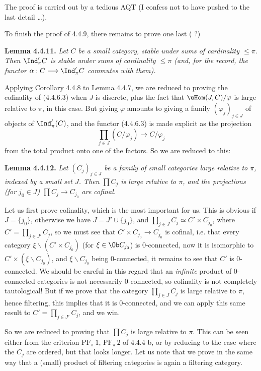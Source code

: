 The proof is carried out by a tedious AQT (I confess not to have pushed to the last detail \ldots).

To finish the proof of 4.4.9, there remains to prove one last ( ?)

\textbf{Lemma 4.4.11.} \textit{Let $C$ be a small category, stable under sums of cardinality $\leqslant \pi$. Then $\Ind'_\pi C$ is stable under sums of cardinality $\leqslant \pi$ (and, for the record, the functor $\alpha : C \longrightarrow \Ind'_\pi C$ commutes with them).}

Applying Corollary 4.4.8 to Lemma 4.4.7, we are reduced to proving the cofinality of (4.4.6.3) when $J$ is discrete, plus the fact that $\uHom(J,C)/\varphi$ is large relative to $\pi$, in this case. But giving $\varphi$ amounts to giving a family $(\varphi_j)_{j\in J}$ of objects of $\Ind'_\pi(C)$, and the functor (4.4.6.3) is made explicit as the projection
\[
\prod_{j\in J} (C/\varphi_j) \longrightarrow C/\varphi_j
\]
from the total product onto one of the factors. So we are reduced to this:

\textbf{Lemma 4.4.12.} \textit{Let $(C_j)_{j\in J}$ be a family of small categories large relative to $\pi$, indexed by a small set $J$. Then $\prod C_j$ is large relative to $\pi$, and the projections (for $j_0 \in J$) $\prod C_j \longrightarrow C_{j_0}$ are cofinal.}

Let us first prove cofinality, which is the most important for us. This is obvious if $J = \{j_0\}$, otherwise we have $J = J' \cup \{j_0\}$, and $\prod_{j\in J} C_j \simeq C' \times C_{j_0}$, where $C' = \prod_{j\in J'} C_j$, so we must see that $C' \times C_{j_0} \longrightarrow C_{j_0}$ is cofinal, i.e. that every category $\xi\backslash(C' \times C_{j_0})$ (for $\xi \in \Ob C_{j_0}$) is 0-connected, now it is isomorphic to $C' \times (\xi\backslash C_{j_0})$, and $\xi\backslash C_{j_0}$ being 0-connected, it remains to see that $C'$ is 0-connected. We should be careful in this regard that an \textit{infinite} product of 0-connected categories is not necessarily 0-connected, so cofinality is not completely tautological! But if we prove that the category $\prod_{j\in J} C_j$ is
large relative to $\pi$, hence filtering, this implies that it is 0-connected, and we can apply this same result to $C' = \prod_{j\in J'} C_j$, and we win.

So we are reduced to proving that $\prod C_j$ is large relative to $\pi$. This can be seen either from the criterion $\mathrm{PF}_\pi\,1$, $\mathrm{PF}_\pi\,2$ of 4.4.4 b, or by reducing to the case where the $C_j$ are ordered, but that looks longer. Let us note that we prove in the same way that a (small) product of filtering categories is again a filtering category.

